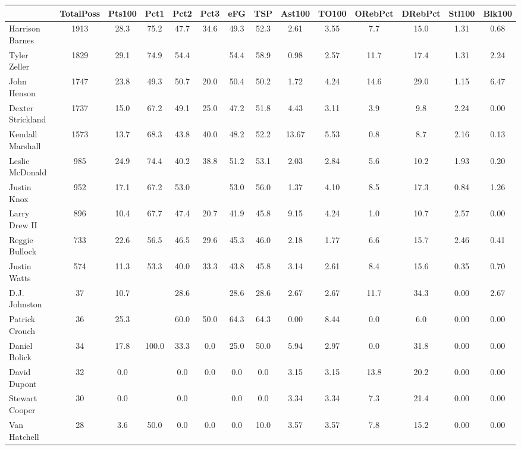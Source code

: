 \documentclass[10pt,letterpaper]{article}
\begin{document}
\begin{table}[ht]
\begin{center}
\begin{tabular}{lccccccccccccc}
  \hline
 & TotalPoss & Pts100 & Pct1 & Pct2 & Pct3 & eFG & TSP & Ast100 & TO100 & ORebPct & DRebPct & Stl100 & Blk100 \\ 
  \hline
Harrison Barnes & 1913 & 28.3 & 75.2 & 47.7 & 34.6 & 49.3 & 52.3 & 2.61 & 3.55 & 7.7 & 15.0 & 1.31 & 0.68 \\ 
  Tyler Zeller & 1829 & 29.1 & 74.9 & 54.4 &  & 54.4 & 58.9 & 0.98 & 2.57 & 11.7 & 17.4 & 1.31 & 2.24 \\ 
  John Henson & 1747 & 23.8 & 49.3 & 50.7 & 20.0 & 50.4 & 50.2 & 1.72 & 4.24 & 14.6 & 29.0 & 1.15 & 6.47 \\ 
  Dexter Strickland & 1737 & 15.0 & 67.2 & 49.1 & 25.0 & 47.2 & 51.8 & 4.43 & 3.11 & 3.9 & 9.8 & 2.24 & 0.00 \\ 
  Kendall Marshall & 1573 & 13.7 & 68.3 & 43.8 & 40.0 & 48.2 & 52.2 & 13.67 & 5.53 & 0.8 & 8.7 & 2.16 & 0.13 \\ 
  Leslie McDonald & 985 & 24.9 & 74.4 & 40.2 & 38.8 & 51.2 & 53.1 & 2.03 & 2.84 & 5.6 & 10.2 & 1.93 & 0.20 \\ 
  Justin Knox & 952 & 17.1 & 67.2 & 53.0 &  & 53.0 & 56.0 & 1.37 & 4.10 & 8.5 & 17.3 & 0.84 & 1.26 \\ 
  Larry Drew II & 896 & 10.4 & 67.7 & 47.4 & 20.7 & 41.9 & 45.8 & 9.15 & 4.24 & 1.0 & 10.7 & 2.57 & 0.00 \\ 
  Reggie Bullock & 733 & 22.6 & 56.5 & 46.5 & 29.6 & 45.3 & 46.0 & 2.18 & 1.77 & 6.6 & 15.7 & 2.46 & 0.41 \\ 
  Justin Watts & 574 & 11.3 & 53.3 & 40.0 & 33.3 & 43.8 & 45.8 & 3.14 & 2.61 & 8.4 & 15.6 & 0.35 & 0.70 \\ 
  D.J. Johnston & 37 & 10.7 &  & 28.6 &  & 28.6 & 28.6 & 2.67 & 2.67 & 11.7 & 34.3 & 0.00 & 2.67 \\ 
  Patrick Crouch & 36 & 25.3 &  & 60.0 & 50.0 & 64.3 & 64.3 & 0.00 & 8.44 & 0.0 & 6.0 & 0.00 & 0.00 \\ 
  Daniel Bolick & 34 & 17.8 & 100.0 & 33.3 & 0.0 & 25.0 & 50.0 & 5.94 & 2.97 & 0.0 & 31.8 & 0.00 & 0.00 \\ 
  David Dupont & 32 & 0.0 &  & 0.0 & 0.0 & 0.0 & 0.0 & 3.15 & 3.15 & 13.8 & 20.2 & 0.00 & 0.00 \\ 
  Stewart Cooper & 30 & 0.0 &  & 0.0 &  & 0.0 & 0.0 & 3.34 & 3.34 & 7.3 & 21.4 & 0.00 & 0.00 \\ 
  Van Hatchell & 28 & 3.6 & 50.0 & 0.0 & 0.0 & 0.0 & 10.0 & 3.57 & 3.57 & 7.8 & 15.2 & 0.00 & 0.00 \\ 
   \hline
\end{tabular}
\end{center}
\end{table}
\end{document}
